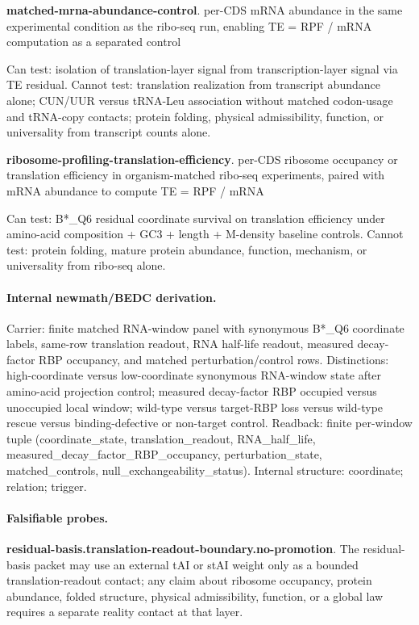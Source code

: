 \textbf{matched-mrna-abundance-control}. per-CDS mRNA abundance in the same experimental condition as the ribo-seq run, enabling TE = RPF / mRNA computation as a separated control

Can test: isolation of translation-layer signal from transcription-layer signal via TE residual. Cannot test: translation realization from transcript abundance alone; CUN/UUR versus tRNA-Leu association without matched codon-usage and tRNA-copy contacts; protein folding, physical admissibility, function, or universality from transcript counts alone.

\textbf{ribosome-profiling-translation-efficiency}. per-CDS ribosome occupancy or translation efficiency in organism-matched ribo-seq experiments, paired with mRNA abundance to compute TE = RPF / mRNA

Can test: B*\_Q6 residual coordinate survival on translation efficiency under amino-acid composition + GC3 + length + M-density baseline controls. Cannot test: protein folding, mature protein abundance, function, mechanism, or universality from ribo-seq alone.

\paragraph{Internal newmath/BEDC derivation.} Carrier: finite matched RNA-window panel with synonymous B*\_Q6 coordinate labels, same-row translation readout, RNA half-life readout, measured decay-factor RBP occupancy, and matched perturbation/control rows. Distinctions: high-coordinate versus low-coordinate synonymous RNA-window state after amino-acid projection control; measured decay-factor RBP occupied versus unoccupied local window; wild-type versus target-RBP loss versus wild-type rescue versus binding-defective or non-target control. Readback: finite per-window tuple (coordinate\_state, translation\_readout, RNA\_half\_life, measured\_decay\_factor\_RBP\_occupancy, perturbation\_state, matched\_controls, null\_exchangeability\_status). Internal structure: coordinate; relation; trigger.

\paragraph{Falsifiable probes.}
\textbf{residual-basis.translation-readout-boundary.no-promotion}. The residual-basis packet may use an external tAI or stAI weight only as a bounded translation-readout contact; any claim about ribosome occupancy, protein abundance, folded structure, physical admissibility, function, or a global law requires a separate reality contact at that layer.

